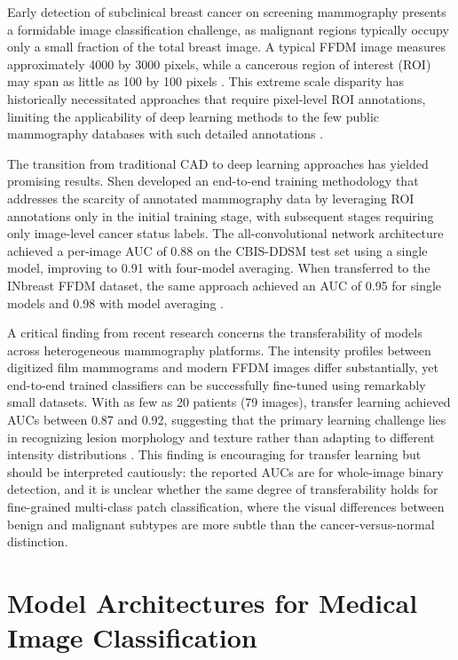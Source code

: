 \documentclass[justified,notoc,openany]{tufte-book}
\begin{document}
Early detection of subclinical breast cancer on screening mammography presents a formidable image classification challenge, as malignant regions typically occupy only a small fraction of the total breast image. A typical FFDM image measures approximately 4000 by 3000 pixels, while a cancerous region of interest (ROI) may span as little as 100 by 100 pixels \cite{Carriero2024}. This extreme scale disparity has historically necessitated approaches that require pixel-level ROI annotations, limiting the applicability of deep learning methods to the few public mammography databases with such detailed annotations \cite{Lee2017,Carriero2024}.

The transition from traditional CAD to deep learning approaches has yielded promising results. Shen \cite{Shen2017} developed an end-to-end training methodology that addresses the scarcity of annotated mammography data by leveraging ROI annotations only in the initial training stage, with subsequent stages requiring only image-level cancer status labels. The all-convolutional network architecture achieved a per-image AUC of 0.88 on the CBIS-DDSM test set using a single model, improving to 0.91 with four-model averaging. When transferred to the INbreast FFDM dataset, the same approach achieved an AUC of 0.95 for single models and 0.98 with model averaging \cite{Shen2017}.

A critical finding from recent research concerns the transferability of models across heterogeneous mammography platforms. The intensity profiles between digitized film mammograms and modern FFDM images differ substantially, yet end-to-end trained classifiers can be successfully fine-tuned using remarkably small datasets. With as few as 20 patients (79 images), transfer learning achieved AUCs between 0.87 and 0.92, suggesting that the primary learning challenge lies in recognizing lesion morphology and texture rather than adapting to different intensity distributions \cite{Carriero2024}. This finding is encouraging for transfer learning but should be interpreted cautiously: the reported AUCs are for whole-image binary detection, and it is unclear whether the same degree of transferability holds for fine-grained multi-class patch classification, where the visual differences between benign and malignant subtypes are more subtle than the cancer-versus-normal distinction.

\section{Model Architectures for Medical Image Classification}\label{model-architectures-for-medical-image-classification}
\end{document}
